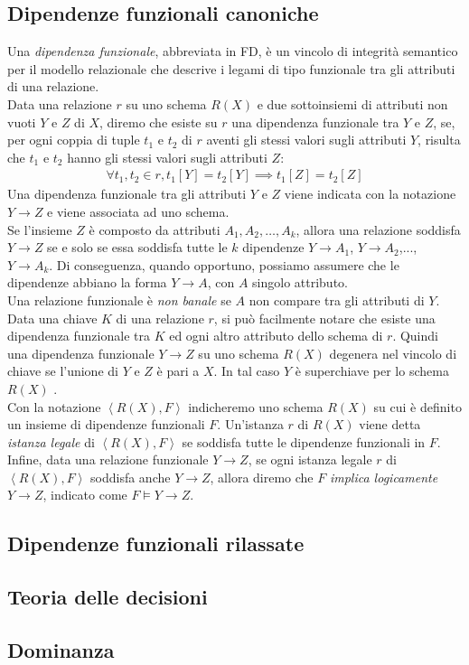 \subsection{Dipendenze funzionali canoniche}
Una \textit{dipendenza funzionale}, abbreviata in FD, è un vincolo di integrità semantico per il modello relazionale che descrive i legami di tipo funzionale tra gli attributi di una relazione. \\
Data una relazione $r$ su uno schema $R(X)$ e due sottoinsiemi di attributi non vuoti $Y$ e $Z$ di $X$, diremo che esiste su $r$ una dipendenza funzionale tra $Y$ e $Z$, se, per ogni coppia di tuple $t_1$ e $t_2$ di $r$ aventi gli stessi valori sugli attributi $Y$, risulta che $t_1$ e $t_2$ hanno gli stessi valori sugli attributi $Z$:
\begin{eqnarray}
\forall t_1, t_2 \in r, t_1[Y] = t_2[Y] \implies t_1[Z] = t_2[Z]
\end{eqnarray}
Una dipendenza funzionale tra gli attributi $Y$ e $Z$ viene indicata con la notazione $Y \rightarrow Z$ e viene associata ad uno schema.\\
Se l'insieme $Z$ è composto da attributi $A_1, A_2, \ldots, A_k$, allora una relazione soddisfa $Y \rightarrow Z$ se e solo se essa soddisfa tutte le $k$ dipendenze $Y \rightarrow A_1$, $Y \rightarrow A_2$,..., $Y \rightarrow A_k$. Di conseguenza, quando opportuno, possiamo assumere che le dipendenze abbiano la forma $Y \rightarrow A$, con $A$ singolo attributo. \\
Una relazione funzionale è \textit{non banale} se $A$ non compare tra gli attributi di $Y$. \\
Data una chiave $K$ di una relazione $r$, si può facilmente notare che esiste una dipendenza funzionale tra $K$ ed ogni altro attributo dello schema di $r$. Quindi una dipendenza funzionale $Y \rightarrow Z$ su uno schema $R(X)$ degenera nel vincolo di chiave se l'unione di $Y$ e $Z$ è pari a $X$. In tal caso $Y$ è superchiave per lo schema $R(X)$ . \\
Con la notazione $\left\langle R(X), F \right\rangle$ indicheremo uno schema $R(X)$ su cui è definito un insieme di dipendenze funzionali $F$. Un'istanza $r$ di $R(X)$ viene detta \textit{istanza legale} di  $\left\langle R(X), F \right\rangle$ se soddisfa tutte le dipendenze funzionali in $F$. Infine, data una relazione funzionale $Y \rightarrow Z$, se ogni istanza legale $r$ di $\left\langle R(X), F \right\rangle$ soddisfa anche $Y \rightarrow Z$, allora diremo che $F$ \textit{implica logicamente} $Y \rightarrow Z$, indicato come $F \models Y \rightarrow Z$.\\

\subsection{Dipendenze funzionali rilassate}
\subsection{Teoria delle decisioni}
\subsection{Dominanza}